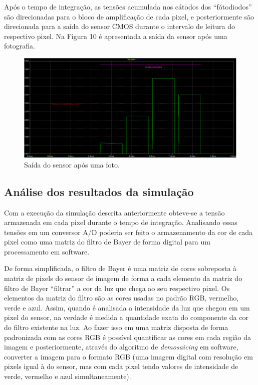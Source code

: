 \documentclass[10pt,a4paper,twocolumn]{article}
\begin{document}
	 Após o tempo de integração, as tensões acumulada nos cátodos dos ``fótodiodos'' são direcionadas para o bloco de amplificação de cada pixel, e posteriormente são direcionada para a saída do sensor CMOS durante o intervalo de leitura do respectivo pixel. Na Figura 10 é apresentada a saída da sensor após uma fotografia.
	
	\begin{figure}[!h]
		\centering
		\includegraphics[scale=0.256]{imagens/saida.png}
		\caption{Saída do sensor após uma foto.}
	\end{figure}
		
	\subsection*{Análise dos resultados da simulação}
	 Com a execução da simulação descrita anteriormente obteve-se a tensão armazenada em cada pixel durante o tempo de integração. Analisando essas tensões em um conversor A/D poderia ser feito o armazenamento da cor de cada pixel como uma matriz do filtro de Bayer \cite{bayer} de forma digital para um processamento em software.
	 
	 De forma simplificada, o filtro de Bayer é uma matriz de cores sobreposta à matriz de pixels do sensor de imagem de forma a cada elemento da matriz do filtro de Bayer ``filtrar'' a cor da luz que chega ao seu respectivo pixel. Os elementos da matriz do filtro são as cores usadas no padrão RGB, vermelho, verde e azul. Assim, quando é analisada a intensidade da luz que chegou em um pixel do sensor, na verdade é medida a quantidade exata do componente da cor do filtro existente na luz. Ao fazer isso em uma matriz disposta de forma padronizada com as cores RGB é possível quantificar as cores em cada região da imagem e posteriormente, através do algoritmo de \textit{demosaicing} \cite{bayer} em software, converter a imagem para o formato RGB (uma imagem digital com resolução em pixels igual à do sensor, mas com cada pixel tendo valores de intensidade de verde, vermelho e azul simultaneamente).
	 
\end{document}

